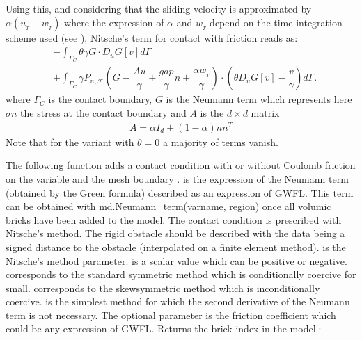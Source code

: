 \documentclass[a4paper,11pt,english]{sphinxmanual}
\begin{document}
Using this, and considering that the sliding velocity is approximated by \(\alpha(u_{_T} - w_{_T})\) where the expression of \(\alpha\) and \(w_{_T}\) depend on the time integration scheme used (see {\hyperref[\detokenize{userdoc/model_contact_friction:weak-integral-contact-section}]{}}), Nitsche’s term for contact with friction reads as:
\begin{equation*}
\begin{split}&-\int_{\Gamma_C} \theta \gamma G\cdot D_u G[v] d\Gamma \\
&+\int_{\Gamma_C} \gamma P_{n,\mathscr{F}}(G - \dfrac{Au}{\gamma} + \dfrac{gap}{\gamma}n + \dfrac{\alpha w_{_T}}{\gamma})\cdot(\theta D_u G[v] - \dfrac{v}{\gamma}) d\Gamma.\end{split}
\end{equation*}
where \(\Gamma_C\) is the contact boundary, \(G\) is the Neumann term which represents here \(\sigma n\) the stress at the contact boundary and \(A\) is the \(d\times d\) matrix
\begin{equation*}
\begin{split}A = \alpha I_d + (1-\alpha)n n^T\end{split}
\end{equation*}
Note that for the variant with \(\theta=0\) a majority of terms vanish.

The following function adds a contact condition with or without Coulomb
friction on the variable
 and the mesh boundary .  
is the expression of the Neumann term (obtained by the Green formula)
described as an expression of GWFL. This term can be obtained with
md.Neumann\_term(varname, region) once all volumic bricks have
been added to the model. The contact condition
is prescribed with Nitsche’s method. The rigid obstacle should
be described with the data  being a signed distance to
the obstacle (interpolated on a finite element method).
 is the Nitsche’s method parameter.
 is a scalar value which can be
positive or negative.  corresponds to the standard symmetric
method which is conditionally coercive for   small.
 corresponds to the skew\sphinxhyphen{}symmetric method which is
inconditionally coercive.  is the simplest method
for which the second derivative of the Neumann term is not necessary.
The optional parameter  is the friction
coefficient which could be any expression of GWFL.
Returns the brick index in the model.:
\end{document}
